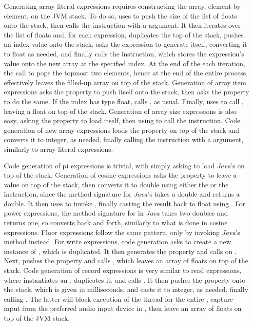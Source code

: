 Generating array literal expressions requires constructing the array, element by element, on the JVM stack. To do so,  uses  to push the size of the list of floats onto the stack, then calls the  instruction with a  argument. It then iterates over the list of floats and, for each expression, duplicates the top of the stack, pushes an index value onto the stack, asks the expression to generate itself, converting it to float as needed, and finally calls the  instruction, which stores the expression's value onto the new array at the specified index. At the end of the each iteration, the call to  pops the topmost two elements, hence at the end of the entire process,  effectively leaves the filled-up array on top of the stack. Generation of array item expressions asks the  property to push itself onto the stack, then asks the  property to do the same. If the index has type float,  calls , as usual. Finally,  uses  to call , leaving a float on top of the stack. Generation of array size expressions is also easy, asking the  property to load itself, then using  to call the  instruction. Code generation of new array expressions loads the  property on top of the stack and converts it to integer, as needed, finally calling the  instruction with a  argument, similarly to array literal expressions.

Code generation of pi expressions is trivial, with  simply asking  to load \emph{Java}'s  on top of the stack. Generation of cosine expressions asks the  property to leave a value on top of the stack, then converts it to double using either the  or the  instruction, since the method signature for \emph{Java}'s  takes a double and returns a double. It then uses  to invoke , finally casting the result back to float using . For power expressions, the method signature for  in \emph{Java} takes two doubles and returns one, so  converts back and forth, similarly to what is done in cosine expressions. Floor expressions follow the same pattern, only by invoking \emph{Java}'s  method instead. For write expressions, code generation asks  to create a new instance of , which is duplicated. It then generates the  property and calls  on . Next,  pushes the  property and calls , which leaves an array of floats on top of the stack. Code generation of record expressions is very similar to read expressions, where  instantiates an , duplicates it, and calls . It then pushes the  property onto the stack, which is given in milliseconds, and casts it to integer, as needed, finally calling . The latter will block execution of the  thread for the entire , capture input from the preferred audio input device in , then leave an array of floats on top of the JVM stack.

